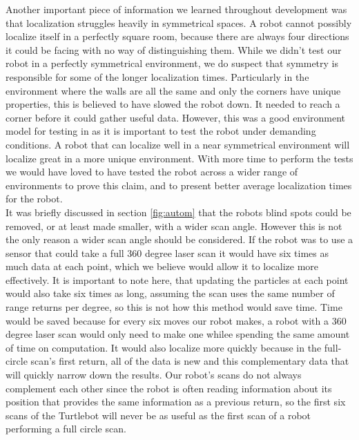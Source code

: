 \documentclass{article}
\begin{document}
Another important piece of information we learned throughout development was that localization struggles heavily in symmetrical spaces. A robot cannot possibly localize itself in a perfectly square room, because there are always four directions it could be facing with no way of distinguishing them. While we didn't test our robot in a perfectly symmetrical environment, we do suspect that symmetry is responsible for some of the longer localization times. Particularly in the environment where the walls are all the same and only the corners have unique properties, this is believed to have slowed the robot down. It needed to reach a corner before it could gather useful data. However, this was a good environment model for testing in as it is important to test the robot under demanding conditions. A robot that can localize well in a near symmetrical environment will localize great in a more unique environment. With more time to perform the tests we would have loved to have tested the robot across a wider range of environments to prove this claim, and to present better average localization times for the robot.\\

It was briefly discussed in section \ref{fig:autom} that the robots blind spots could be removed, or at least made smaller, with a wider scan angle. However this is not the only reason a wider scan angle should be considered. If the robot was to use a sensor that could take a full 360 degree laser scan it would have six times as much data at each point, which we believe would allow it to localize more effectively. It is important to note here, that updating the particles at each point would also take six times as long, assuming the scan uses the same number of range returns per degree, so this is not how this method would save time. Time would be saved because for every six moves our robot makes, a robot with a 360 degree laser scan would only need to make one whilee spending the same amount of time on computation. It would also localize more quickly because in the full-circle scan's first return, all of the data is new and this complementary data that will quickly narrow down the results. Our robot's scans do not always complement each other since the robot is often reading information about its position that provides the same information as a previous return, so the first six scans of the Turtlebot will never be as useful as the first scan of a robot performing a full circle scan.\\
\end{document}
